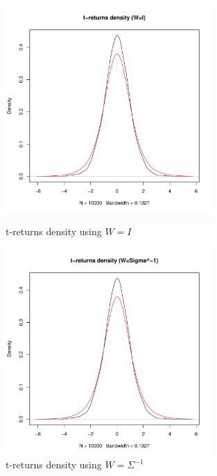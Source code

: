 \begin{figure}\label{t-returns_density}
    \centering
    \includegraphics[width=0.7\textwidth]{t-returns_density_(W=I).pdf}
    \caption{t-returns density using $W=I$}
    \includegraphics[width=0.7\textwidth]{t-returns_density_(W=Sigma^-1).pdf}
    \caption{t-returns density using $W=\Sigma^{-1}$}
\end{figure}
